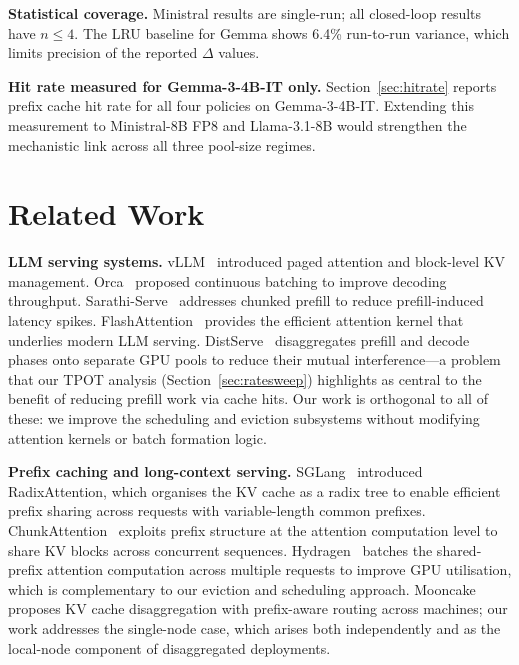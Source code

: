 \documentclass[journal]{IEEEtran}
\begin{document}
\textbf{Statistical coverage.}  Ministral results are single-run; all
closed-loop results have $n\leq4$.  The LRU baseline for Gemma shows 6.4\%
run-to-run variance, which limits precision of the reported $\Delta$ values.

\textbf{Hit rate measured for Gemma-3-4B-IT only.}
Section~\ref{sec:hitrate} reports prefix cache hit rate for all four policies
on Gemma-3-4B-IT.  Extending this measurement to Ministral-8B FP8 and
Llama-3.1-8B would strengthen the mechanistic link across all three
pool-size regimes.

\section{Related Work}
\label{sec:related}

\textbf{LLM serving systems.}
vLLM~\cite{kwon2023efficient} introduced paged attention and block-level KV
management.  Orca~\cite{yu2022orca} proposed continuous batching to improve
decoding throughput.  Sarathi-Serve~\cite{agrawal2024sarathi} addresses
chunked prefill to reduce prefill-induced latency spikes.
FlashAttention~\cite{dao2022flashattention} provides the efficient attention
kernel that underlies modern LLM serving.
DistServe~\cite{zhong2024distserve} disaggregates prefill and decode phases
onto separate GPU pools to reduce their mutual interference—a problem that our
TPOT analysis (Section~\ref{sec:ratesweep}) highlights as central to the
benefit of reducing prefill work via cache hits.
Our work is orthogonal to all of these: we improve the scheduling and
eviction subsystems without modifying attention kernels or batch formation
logic.

\textbf{Prefix caching and long-context serving.}
SGLang~\cite{zheng2023sglang} introduced RadixAttention, which organises the
KV cache as a radix tree to enable efficient prefix sharing across requests
with variable-length common prefixes.  ChunkAttention~\cite{ye2024chunkattention}
exploits prefix structure at the attention computation level to share KV blocks
across concurrent sequences.  Hydragen~\cite{juravsky2024hydragen} batches
the shared-prefix attention computation across multiple requests to improve GPU
utilisation, which is complementary to our eviction and scheduling approach.
Mooncake~\cite{qin2024mooncake} proposes KV cache disaggregation with
prefix-aware routing across machines; our work addresses the single-node case,
which arises both independently and as the local-node component of disaggregated
deployments.
\end{document}
